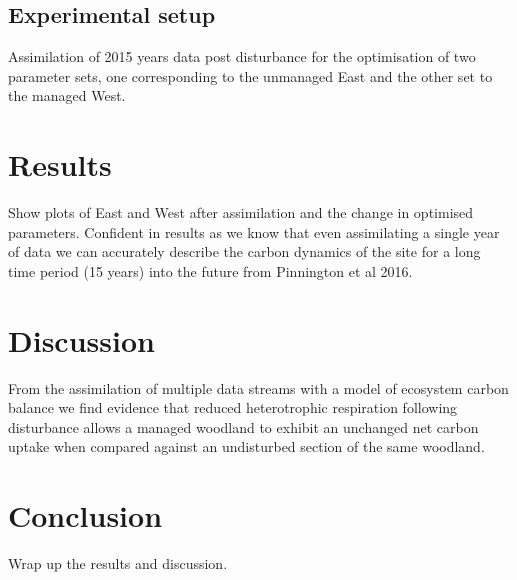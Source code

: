 \documentclass[11pt]{article}
\begin{document}
\subsection{Experimental setup}
Assimilation of 2015 years data post disturbance for the optimisation of two parameter sets, one corresponding to the unmanaged East and the other set to the managed West.

\section{Results}
Show plots of East and West after assimilation and the change in optimised parameters. Confident in results as we know that even assimilating a single year of data we can accurately describe the carbon dynamics of the site for a long time period (15 years) into the future from Pinnington et al 2016.

\section{Discussion}
From the assimilation of multiple data streams with a model of ecosystem carbon balance we find evidence that reduced heterotrophic respiration following disturbance allows a managed woodland to exhibit an unchanged net carbon uptake when compared against an undisturbed section of the same woodland. 

\section{Conclusion}
Wrap up the results and discussion.


{}
\end{document}
